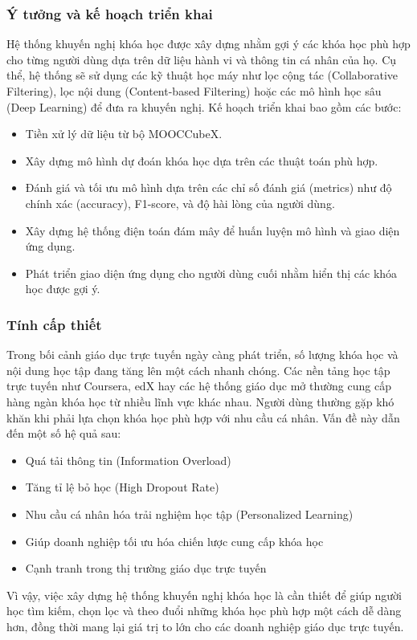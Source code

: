 \subsubsection{Ý tưởng và kế hoạch triển khai}
Hệ thống khuyến nghị khóa học được xây dựng nhằm gợi ý các khóa học phù hợp cho từng người dùng dựa trên dữ liệu hành vi và thông tin cá nhân của họ. Cụ thể, hệ thống sẽ sử dụng các kỹ thuật học máy như lọc cộng tác (Collaborative Filtering), lọc nội dung (Content-based Filtering) hoặc các mô hình học sâu (Deep Learning) để đưa ra khuyến nghị. Kế hoạch triển khai bao gồm các bước:
\begin{itemize}
    \item Tiền xử lý dữ liệu từ bộ MOOCCubeX.
    \item Xây dựng mô hình dự đoán khóa học dựa trên các thuật toán phù hợp.
    \item Đánh giá và tối ưu mô hình dựa trên các chỉ số đánh giá (metrics) như độ chính xác (accuracy), F1-score, và độ hài lòng của người dùng.
    \item Xây dựng hệ thống điện toán đám mây để huấn luyện mô hình và giao diện ứng dụng.
    \item Phát triển giao diện ứng dụng cho người dùng cuối nhằm hiển thị các khóa học được gợi ý.
\end{itemize}
\subsubsection{Tính cấp thiết}
Trong bối cảnh giáo dục trực tuyến ngày càng phát triển, số lượng khóa học và nội dung học tập đang tăng lên một cách nhanh chóng. Các nền tảng học tập trực tuyến như Coursera, edX hay các hệ thống giáo dục mở thường cung cấp hàng ngàn khóa học từ nhiều lĩnh vực khác nhau. Người dùng thường gặp khó khăn khi phải lựa chọn khóa học phù hợp với nhu cầu cá nhân. Vấn đề này dẫn đến một số hệ quả sau:
\begin{itemize}
    \item Quá tải thông tin (Information Overload)
    \item Tăng tỉ lệ bỏ học (High Dropout Rate)
    \item Nhu cầu cá nhân hóa trải nghiệm học tập (Personalized Learning)
    \item Giúp doanh nghiệp tối ưu hóa chiến lược cung cấp khóa học
    \item Cạnh tranh trong thị trường giáo dục trực tuyến
\end{itemize}
Vì vậy, việc xây dựng hệ thống khuyến nghị khóa học là cần thiết để giúp người học tìm kiếm, chọn lọc và theo đuổi những khóa học phù hợp một cách dễ dàng hơn, đồng thời mang lại giá trị to lớn cho các doanh nghiệp giáo dục trực tuyến.
